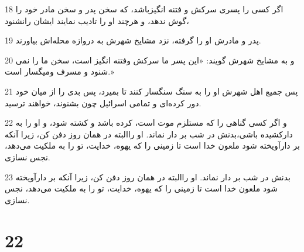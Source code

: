 \par 18 اگر کسی را پسری سرکش و فتنه انگیزباشد، که سخن پدر و سخن مادر خود را گوش ندهد، و هر‌چند او را تادیب نمایند ایشان رانشنود،
\par 19 پدر و مادرش او را گرفته، نزد مشایخ شهرش به دروازه محله‌اش بیاورند.
\par 20 و به مشایخ شهرش گویند: «این پسر ما سرکش وفتنه انگیز است، سخن ما را نمی شنود و مسرف ومیگسار است.»
\par 21 پس جمیع اهل شهرش او را به سنگ سنگسار کنند تا بمیرد، پس بدی را از میان خود دور کرده‌ای و تمامی اسرائیل چون بشنوند، خواهند ترسید.
\par 22 و اگر کسی گناهی را که مستلزم موت است، کرده باشد و کشته شود، و او را به دارکشیده باشی،بدنش در شب بر دار نماند. او راالبته در همان روز دفن کن، زیرا آنکه بر دارآویخته شود ملعون خدا است تا زمینی را که یهوه، خدایت، تو را به ملکیت می‌دهد، نجس نسازی.
\par 23 بدنش در شب بر دار نماند. او راالبته در همان روز دفن کن، زیرا آنکه بر دارآویخته شود ملعون خدا است تا زمینی را که یهوه، خدایت، تو را به ملکیت می‌دهد، نجس نسازی.
 
\chapter{22}


